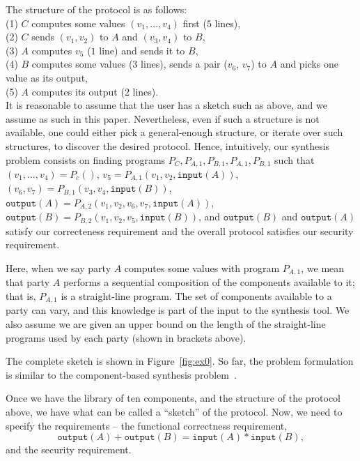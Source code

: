 \documentclass[preprint]{sig-alternate-05-2015}
\begin{document}
The structure of the protocol is as follows:\\
(1) $C$ computes some values $(v_1, \ldots, v_4)$ first ($5$ lines), \\
(2) $C$ sends $(v_1, v_2)$ to $A$ and  $(v_3, v_4)$ to $B$,\\
(3) $A$ computes $v_5$ ($1$ line) and sends it to $B$,\\
(4) $B$ computes some values ($3$ lines), 
sends a pair ($v_6$, $v_7$) to $A$ and picks one value as its output, \\
(5) $A$ computes its output ($2$ lines).\\
It is reasonable to assume that the user has a sketch such as above,
and we assume as such in this paper.
Nevertheless, even if such a structure is not available, one could either
pick a general-enough structure, or
iterate over such structures, to discover the desired protocol.
Hence, intuitively, our synthesis problem consists on
finding programs
$P_C, P_{A,1}, P_{B,1}, P_{A,1}, P_{B,1}$ such that
$(v_1, \ldots, v_4) = P_c()$,
$v_5 = P_{A,1}(v_1, v_2, \mathtt{input}(A))$,
$(v_6, v_7) = P_{B,1}(v_3, v_4, \mathtt{input}(B))$,
$\mathtt{output}(A) = P_{A,2}(v_1, v_2, v_6, v_7, \mathtt{input}(A))$,
$\mathtt{output}(B) = P_{B,2}(v_1, v_2, v_5, \mathtt{input}(B))$,
and $\mathtt{output}(B)$ and $\mathtt{output}(A)$
satisfy our correcteness requirement and the overall
protocol satisfies our security requirement.

Here, when we say party $A$ computes some values
with program $P_{A,1}$, we mean that party $A$ performs a 
sequential composition of the components available to it; that is,
$P_{A,1}$ is a straight-line program.
The set of components available to a party can vary, and this knowledge
is part of the input to the synthesis tool.  
We also assume we are given an upper
bound on the length of the straight-line programs
used by each party (shown in brackets above).   


The complete sketch is shown in Figure~\ref{fig:ex0}.
So far, the problem formulation
is similar to the component-based synthesis problem~\cite{bitvector}.

Once we have the library of ten components, and the structure of the protocol
above, we have what can be called a ``sketch'' of the protocol.  Now, we need
to specify the requirements -- the functional correctness requirement,
$$\mathtt{output}(A) + \mathtt{output}(B) = \mathtt{input}(A)*\mathtt{input}(B),$$
and the security requirement.
\end{document}
